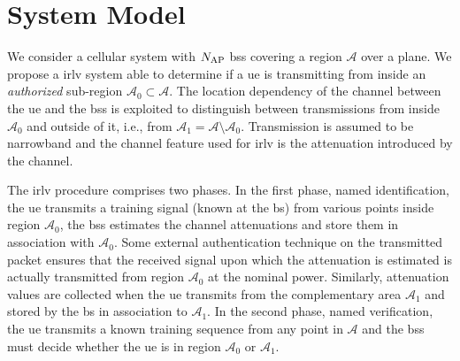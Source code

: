 \documentclass[conference]{IEEEtran}
\begin{document}
 
\section{System Model}\label{sec:sys model}


We consider a cellular system with $N_{\rm AP}$ \acp{bs} covering a region $\mathcal{A}$ over a plane. We propose a \ac{irlv} system able to determine if a \ac{ue} is transmitting from inside an {\em authorized} sub-region $\mathcal{A}_0 \subset \mathcal{A}$. The location dependency of the channel between the \ac{ue} and the \acp{bs} is exploited to distinguish between transmissions from inside $\mathcal{A}_0$ and outside of it, i.e., from  $\mathcal{A}_1=\mathcal{A} \setminus \mathcal{A}_0$.  Transmission is assumed to be narrowband and the channel feature used for \ac{irlv} is the attenuation introduced by the channel.

The \ac{irlv} procedure comprises two phases. In the first phase, named identification, the \ac{ue} transmits a training signal (known at the \acs{bs}) from various points inside region $\mathcal{A}_0$,  the \acp{bs} estimates the channel attenuations and store them in association with $\mathcal{A}_0$. Some external authentication technique on the transmitted packet  ensures that the received signal upon which the attenuation is estimated is actually transmitted from region $\mathcal{A}_0$ at the nominal power. Similarly, attenuation values are collected when the \ac{ue} transmits  from the complementary area $\mathcal{A}_1$ and  stored by the \ac{bs} in association to $\mathcal{A}_1$. In the second  phase, named verification, the \ac{ue} transmits a known training sequence from any point in $\mathcal{A}$ and the \acp{bs} must decide whether the \ac{ue} is in region $\mathcal{A}_0$ or $\mathcal{A}_1$.
\end{document}
